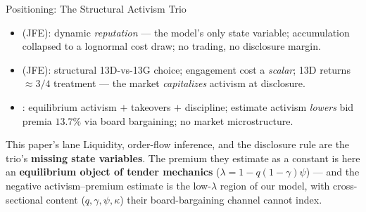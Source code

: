 \documentclass[aspectratio=169,10pt]{beamer}
\newcommand{\1}{\mathbf{1}}
\begin{document}
\begin{frame}{Positioning: The Structural Activism Trio}
\hypertarget{main:positioning}{}
\small
\begin{itemize}\itemsep0.35em
  \item \textbf{\citealp{JohnsonSwem2021}} (JFE): dynamic \emph{reputation} --- the model's only state variable; accumulation collapsed to a lognormal cost draw; no trading, no disclosure margin.
  \item \textbf{\citealp{AlbuquerqueFosSchroth2022}} (JFE): structural 13D-vs-13G choice; engagement cost a \emph{scalar}; 13D returns $\approx 3/4$ treatment --- the market \emph{capitalizes} activism at disclosure.
  \item \textbf{\citealp{CelentanoLevine2025}}: equilibrium activism $+$ takeovers $+$ discipline; estimate activism \emph{lowers} bid premia $13.7\%$ via board bargaining; no market microstructure.
\end{itemize}

\begin{block}{This paper's lane}
\small Liquidity, order-flow inference, and the disclosure rule are the trio's \textbf{missing state variables}. The premium they estimate as a constant is here an \textbf{equilibrium object of tender mechanics} ($\lambda = 1-q(1-\gamma)\psi$) --- and the negative activism--premium estimate is the low-$\lambda$ region of our model, with cross-sectional content ($q,\gamma,\psi,\kappa$) their board-bargaining channel cannot index.
\end{block}
\end{frame}
\end{document}
